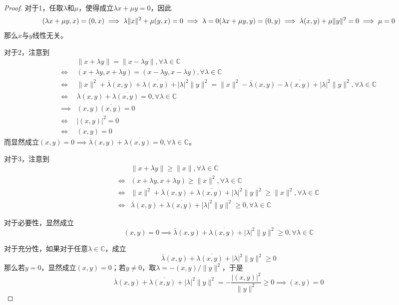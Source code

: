 \documentclass[lang = cn, scheme = chinese, 10pt]{elegantbook}
\newcommand{\C}{\mathbb{C}}  %
\begin{document}
\begin{proof}
	对于1，任取$\lambda$和$\mu$，使得成立$\lambda x+\mu y=0$，因此
	$$
	(\lambda x+\mu y,x)=(0,x)\implies \lambda\|x\|^2+\mu(y,x)=0\implies \lambda=0\\
	(\lambda x+\mu y,y)=(0,y)\implies \lambda(x,y)+\mu\|y\|^2=0\implies \mu=0
	$$
	那么$x$与$y$线性无关。
	
	对于2，注意到
	\begin{align*}
		&\|x+\lambda y \|=\|x-\lambda y\|,\forall\lambda\in\C\\
		\iff & (x+\lambda y,x+\lambda y)=(x-\lambda y,x-\lambda y),\forall\lambda\in\C\\
		\iff & \|x\|^2+\overline{\lambda}(x,y)+\lambda\overline{(x,y)}+|\lambda|^2\|y\|^2=
		\|x\|^2-\overline{\lambda}(x,y)-\lambda\overline{(x,y)}+|\lambda|^2\|y\|^2,\forall\lambda\in\C\\
		\iff & \overline{\lambda}(x,y)+\lambda\overline{(x,y)}=0,\forall\lambda\in\C\\
		\implies & (x,y)\overline{(x,y)}=0\\
		\iff & |(x,y)|^2=0\\
		\iff & (x,y)=0
	\end{align*}
	而显然成立$(x,y)=0\implies\overline{\lambda}(x,y)+\lambda\overline{(x,y)}=0,\forall\lambda\in\C$。
	
	对于3，注意到
	\begin{align*}
		&\|x+\lambda y \|\ge \|x\|,\forall\lambda\in\mathbb{C}\\
		\iff & (x+\lambda y,x+\lambda y) \ge \|x\|^2,\forall\lambda\in\mathbb{C}\\
		\iff & \|x\|^2+\overline{\lambda}(x,y)+\lambda\overline{(x,y)}+|\lambda|^2\|y\|^2\ge \|x\|^2,\forall\lambda\in\mathbb{C}\\
		\iff & \overline{\lambda}(x,y)+\lambda\overline{(x,y)}+|\lambda|^2\|y\|^2\ge 0,\forall\lambda\in\mathbb{C}
	\end{align*}
	
	对于必要性，显然成立
	$$
	(x,y)=0\implies\overline{\lambda}(x,y)+\lambda\overline{(x,y)}+|\lambda|^2\|y\|^2\ge 0,\forall\lambda\in\mathbb{C}
	$$
	
	对于充分性，如果对于任意$\lambda\in\mathbb{C}$，成立
	$$
	\overline{\lambda}(x,y)+\lambda\overline{(x,y)}+|\lambda|^2\|y\|^2\ge 0
	$$
	那么若$y=0$，显然成立$(x,y)=0$；若$y\ne0$，取$\lambda=-(x,y)/\|y\|^2$，于是
	$$
	\overline{\lambda}(x,y)+\lambda\overline{(x,y)}+|\lambda|^2\|y\|^2
	=-\frac{|(x,y)|^2}{\|y\|^2}\ge 0\implies (x,y)=0
	$$
\end{proof}
\end{document}
